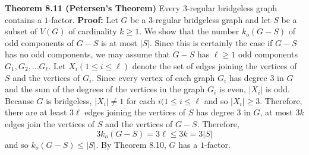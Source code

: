 \nopagenumbers
{\bf Theorem 8.11 (Petersen's Theorem)}
\vskip 6pt
Every $3$-regular bridgeless graph contains a $1$-factor.
\vskip 10pt
{\bf Proof:}
\vskip 6pt
Let $G$ be a $3$-regular bridgeless graph and let $S$ be a subset of $V(G)$ of cardinality $k \geq 1$. We show that the number $k_o(G-S)$ of odd components of $G-S$ is at most $|S|$. Since this is certainly the case if $G-S$ has no odd components, we may assume that $G-S$ has $\ell \geq 1$ odd components $G_1,G_2, \ldots G_{\ell}$. Let $X_i(1 \leq i \leq \ell)$ denote the set of edges joining the vertices of $S$ and the vertices  of $G_i$. Since every vertex of each graph $G_i$ has degree $3$ in $G$ and the sum of the degrees of the vertices in the graph $G_i$ is even, $|X_i|$ is odd. Because $G$ is bridgeless, $|X_i| \neq 1$ for each $i(1 \leq i \leq \ell$ and so $|X_i| \geq 3$. Therefore, there are at least $3\ell$ edges joining the vertices of $S$ has degree $3$ in $G$, at most $3k$ edges join the vertices of $S$ and the vertices of $G-S$. Therefore, $$3k_o(G-S)=3\ell \leq 3k=3|S|$$ and so $k_o(G-S) \leq |S|$. By Theorem 8.10, $G$ has a $1$-factor.

\vfill\eject
